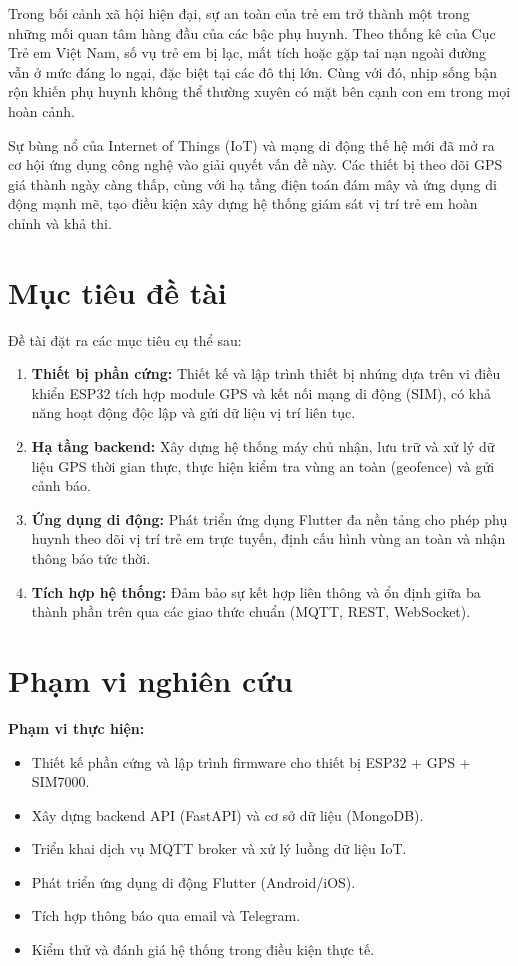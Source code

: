 \documentclass[13pt, a4paper]{report}
\begin{document}
Trong bối cảnh xã hội hiện đại, sự an toàn của trẻ em trở thành một trong những mối quan tâm hàng đầu của các bậc phụ huynh. Theo thống kê của Cục Trẻ em Việt Nam, số vụ trẻ em bị lạc, mất tích hoặc gặp tai nạn ngoài đường vẫn ở mức đáng lo ngại, đặc biệt tại các đô thị lớn. Cùng với đó, nhịp sống bận rộn khiến phụ huynh không thể thường xuyên có mặt bên cạnh con em trong mọi hoàn cảnh.

Sự bùng nổ của Internet of Things (IoT) và mạng di động thế hệ mới đã mở ra cơ hội ứng dụng công nghệ vào giải quyết vấn đề này. Các thiết bị theo dõi GPS giá thành ngày càng thấp, cùng với hạ tầng điện toán đám mây và ứng dụng di động mạnh mẽ, tạo điều kiện xây dựng hệ thống giám sát vị trí trẻ em hoàn chỉnh và khả thi.

\section{Mục tiêu đề tài}

Đề tài đặt ra các mục tiêu cụ thể sau:

\begin{enumerate}
  \item \textbf{Thiết bị phần cứng:} Thiết kế và lập trình thiết bị nhúng dựa trên vi điều khiển ESP32 tích hợp module GPS và kết nối mạng di động (SIM), có khả năng hoạt động độc lập và gửi dữ liệu vị trí liên tục.
  \item \textbf{Hạ tầng backend:} Xây dựng hệ thống máy chủ nhận, lưu trữ và xử lý dữ liệu GPS thời gian thực, thực hiện kiểm tra vùng an toàn (geofence) và gửi cảnh báo.
  \item \textbf{Ứng dụng di động:} Phát triển ứng dụng Flutter đa nền tảng cho phép phụ huynh theo dõi vị trí trẻ em trực tuyến, định cấu hình vùng an toàn và nhận thông báo tức thời.
  \item \textbf{Tích hợp hệ thống:} Đảm bảo sự kết hợp liên thông và ổn định giữa ba thành phần trên qua các giao thức chuẩn (MQTT, REST, WebSocket).
\end{enumerate}

\section{Phạm vi nghiên cứu}

\textbf{Phạm vi thực hiện:}
\begin{itemize}[noitemsep]
  \item Thiết kế phần cứng và lập trình firmware cho thiết bị ESP32 + GPS + SIM7000.
  \item Xây dựng backend API (FastAPI) và cơ sở dữ liệu (MongoDB).
  \item Triển khai dịch vụ MQTT broker và xử lý luồng dữ liệu IoT.
  \item Phát triển ứng dụng di động Flutter (Android/iOS).
  \item Tích hợp thông báo qua email và Telegram.
  \item Kiểm thử và đánh giá hệ thống trong điều kiện thực tế.
\end{itemize}
\end{document}
